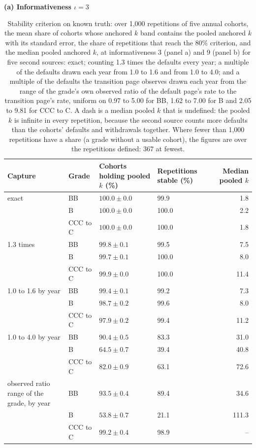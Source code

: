 \begin{table}[htbp]
\centering
\footnotesize
\caption{Stability criterion on known truth: over 1,000 repetitions of five annual cohorts, the mean share of cohorts whose anchored $k$ band contains the pooled anchored $k$ with its standard error, the share of repetitions that reach the 80\% criterion, and the median pooled anchored $k$, at informativeness 3 (panel a) and 9 (panel b) for five second sources: exact; counting 1.3 times the defaults every year; a multiple of the defaults drawn each year from 1.0 to 1.6 and from 1.0 to 4.0; and a multiple of the defaults the transition page observes drawn each year from the range of the grade's own observed ratio of the default page's rate to the transition page's rate, uniform on 0.97 to 5.00 for BB, 1.62 to 7.00 for B and 2.05 to 9.81 for CCC to C. A dash is a median pooled $k$ that is undefined: the pooled $k$ is infinite in every repetition, because the second source counts more defaults than the cohorts' defaults and withdrawals together. Where fewer than 1,000 repetitions have a share (a grade without a usable cohort), the figures are over the repetitions defined: 367 at fewest.}
\label{tab:stability}
\textbf{(a) Informativeness $\iota=3$}\par\smallskip
\begin{tabular}{p{4.2cm}lp{2.4cm}p{2.0cm}r}
\toprule
Capture & Grade & Cohorts holding pooled $k$ (\%) & Repetitions stable (\%) & Median pooled $k$ \\
\midrule
exact & BB & $100.0\pm0.0$ & 99.9 & 1.8 \\
 & B & $100.0\pm0.0$ & 100.0 & 2.2 \\
 & CCC to C & $100.0\pm0.0$ & 100.0 & 1.8 \\
1.3 times & BB & $99.8\pm0.1$ & 99.5 & 7.5 \\
 & B & $99.7\pm0.1$ & 100.0 & 8.0 \\
 & CCC to C & $99.9\pm0.0$ & 100.0 & 11.4 \\
1.0 to 1.6 by year & BB & $99.4\pm0.1$ & 99.2 & 7.3 \\
 & B & $98.7\pm0.2$ & 99.6 & 8.0 \\
 & CCC to C & $97.9\pm0.2$ & 99.4 & 11.2 \\
1.0 to 4.0 by year & BB & $90.4\pm0.5$ & 83.3 & 31.0 \\
 & B & $64.5\pm0.7$ & 39.4 & 40.8 \\
 & CCC to C & $82.0\pm0.9$ & 63.1 & 72.6 \\
observed ratio range of the grade, by year & BB & $93.5\pm0.4$ & 89.4 & 34.6 \\
 & B & $53.8\pm0.7$ & 21.1 & 111.3 \\
 & CCC to C & $99.2\pm0.4$ & 98.9 & -- \\
\bottomrule
\end{tabular}
\medskip


\end{table}
